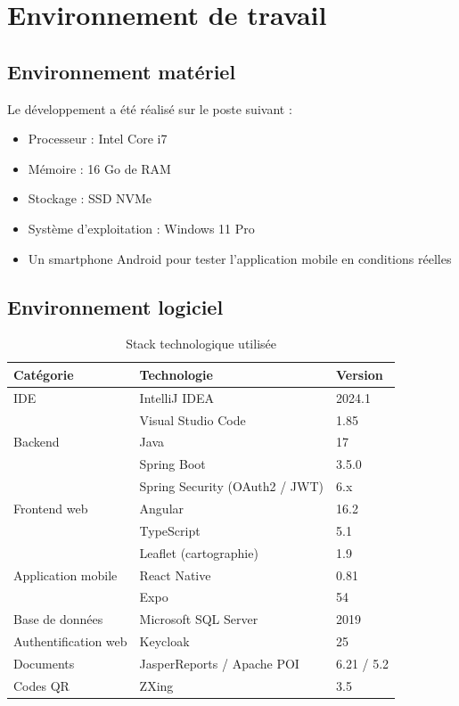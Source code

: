 \documentclass[12pt,a4paper]{report}
\begin{document}
\section{Environnement de travail}

\subsection{Environnement matériel}

Le développement a été réalisé sur le poste suivant :

\begin{itemize}
\item Processeur : Intel Core i7
\item Mémoire : 16 Go de RAM
\item Stockage : SSD NVMe
\item Système d'exploitation : Windows 11 Pro
\item Un smartphone Android pour tester l'application mobile en conditions réelles
\end{itemize}

\subsection{Environnement logiciel}

\begin{table}[htbp]
\centering
\caption{Stack technologique utilisée}
\begin{tabular}{|l|l|l|}
\hline
\textbf{Catégorie} & \textbf{Technologie} & \textbf{Version} \\
\hline
IDE & IntelliJ IDEA & 2024.1 \\
 & Visual Studio Code & 1.85 \\
\hline
Backend & Java & 17 \\
 & Spring Boot & 3.5.0 \\
 & Spring Security (OAuth2 / JWT) & 6.x \\
\hline
Frontend web & Angular & 16.2 \\
 & TypeScript & 5.1 \\
 & Leaflet (cartographie) & 1.9 \\
\hline
Application mobile & React Native & 0.81 \\
 & Expo & 54 \\
\hline
Base de données & Microsoft SQL Server & 2019 \\
\hline
Authentification web & Keycloak & 25 \\
\hline
Documents & JasperReports / Apache POI & 6.21 / 5.2 \\
\hline
Codes QR & ZXing & 3.5 \\
\hline
\end{tabular}
\label{tab:stack_tech}
\end{table}
\end{document}
